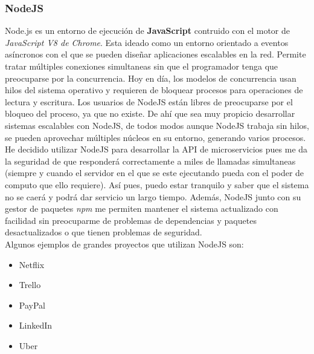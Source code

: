 \subsubsection{NodeJS}
Node.js\cite{nodejs} es un entorno de ejecución de \textbf{JavaScript} contruido con el motor de \emph{JavaScript V8 de Chrome}. Esta ideado como un entorno orientado a eventos asíncronos con el que se pueden diseñar aplicaciones escalables en la red. Permite tratar múltiples conexiones simultaneas sin que el programador tenga que preocuparse por la concurrencia. Hoy en día, los modelos de concurrencia usan hilos del sistema operativo y requieren de bloquear procesos para operaciones de lectura y escritura. Los usuarios de NodeJS están libres de preocuparse por el bloqueo del proceso, ya que no existe. De ahí que sea muy propicio desarrollar sistemas escalables con NodeJS, de todos modos aunque NodeJS trabaja sin hilos, se pueden aprovechar múltiples núcleos en su entorno, generando varios procesos. \\

He decidido utilizar NodeJS para desarrollar la API de microservicios pues me da la seguridad de que responderá correctamente a miles de llamadas simultaneas (siempre y cuando el servidor en el que se este ejecutando pueda con el poder de computo que ello requiere). Así pues, puedo estar tranquilo y saber que el sistema no se caerá y podrá dar servicio un largo tiempo. Además, NodeJS junto con su gestor de paquetes \emph{npm} me permiten mantener el sistema actualizado con facilidad sin preocuparme de problemas de dependencias y paquetes desactualizados o que tienen problemas de seguridad. \\

Algunos ejemplos de grandes proyectos que utilizan NodeJS son:
\begin{itemize}
\item Netflix
\item Trello
\item PayPal
\item LinkedIn
\item Uber
\end{itemize}

